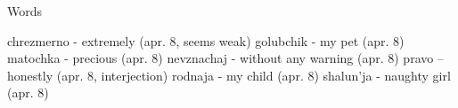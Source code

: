 Words

chrezmerno - extremely (apr. 8, seems weak)
golubchik - my pet (apr. 8)
matochka - precious (apr. 8)
nevznachaj - without any warning (apr. 8)
pravo -- honestly (apr. 8, interjection)
rodnaja - my child (apr. 8)
shalun'ja - naughty girl (apr. 8)